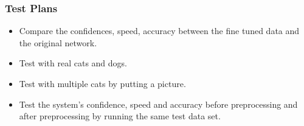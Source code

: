 \subsubsection{Test Plans}

\begin{itemize}
    \item Compare the confidences, speed, accuracy between the fine tuned data and the original network.
    \item Test with real cats and dogs.
    \item Test with multiple cats by putting a picture. 
    \item Test the system's confidence, speed and accuracy before preprocessing and after preprocessing by running the same test data set. 
\end{itemize}


